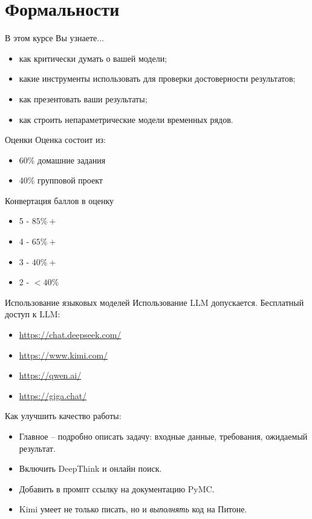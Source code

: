 \documentclass{beamer}
\begin{document}
\section{Формальности}
\begin{frame}{В этом курсе}
Вы узнаете...
\begin{itemize}
    \item как критически думать о вашей модели;
    \item какие инструменты использовать для проверки достоверности результатов;
    \item как презентовать ваши результаты;
    \item как строить непараметрические модели временных рядов.
\end{itemize}
\end{frame}
\begin{frame}{Оценки}
Оценка состоит из:
    \begin{itemize}
        \item 60\% домашние задания
        \item 40\% групповой проект
    \end{itemize}
Конвертация баллов в оценку
    \begin{itemize}
        \item 5 - $85\%+$
        \item 4 - $65\%+$
        \item 3 - $40\%+$
        \item 2 - $<40\%$
    \end{itemize}
\end{frame}

\begin{frame}{Использование языковых моделей}
    Использование LLM допускается. Бесплатный доступ к LLM:
    \begin{itemize}
        \item \href{https://chat.deepseek.com/}{https://chat.deepseek.com/}
        \item \href{https://www.kimi.com/}{https://www.kimi.com/}
        \item \href{https://qwen.ai/}{https://qwen.ai/}
        \item \href{https://giga.chat/}{https://giga.chat/}
    \end{itemize}
    Как улучшить качество работы:
    \begin{itemize}
        \item Главное -- подробно описать задачу: входные данные, требования, ожидаемый результат.
        \item Включить DeepThink и онлайн поиск.
        \item Добавить в промпт ссылку на документацию PyMC.
        \item Kimi умеет не только писать, но и \emph{выполнять} код на Питоне.
    \end{itemize}
\end{frame}
\end{document}
